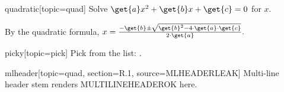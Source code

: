 
\begin{problem}{quadratic}[topic=quad]
	Solve $\get{a}x^2 + \get{b}x + \get{c} = 0$ for $x$.
	\begin{solution}
	By the quadratic formula,
	$x = \frac{-\get{b} \pm \sqrt{\get{b}^2 - 4 \cdot \get{a} \cdot \get{c}}}{2 \cdot \get{a}}.$
	\end{solution}
\end{problem}

\begin{problem}{picky}[topic=pick]
	Pick from the list: .
\end{problem}

\begin{problem}{mlheader}[topic=quad,
                          section=R.1,
                          source=MLHEADERLEAK]
	Multi-line header stem renders MULTILINEHEADEROK here.
\end{problem}

